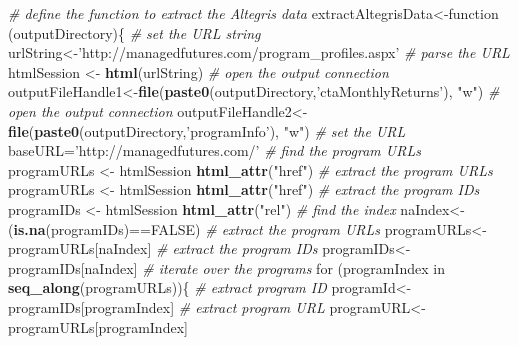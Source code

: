 \documentclass[]{article}
\newenvironment{Shaded}{\begin{snugshade}}{\end{snugshade}}
\newcommand{\KeywordTok}[1]{\textcolor[rgb]{0.13,0.29,0.53}{\textbf{{#1}}}}
\newcommand{\StringTok}[1]{\textcolor[rgb]{0.31,0.60,0.02}{{#1}}}
\newcommand{\CommentTok}[1]{\textcolor[rgb]{0.56,0.35,0.01}{\textit{{#1}}}}
\newcommand{\OtherTok}[1]{\textcolor[rgb]{0.56,0.35,0.01}{{#1}}}
\newcommand{\NormalTok}[1]{{#1}}
\begin{document}
\begin{Shaded}
\begin{Highlighting}[]
\CommentTok{# define the function to extract the Altegris data}
\NormalTok{extractAltegrisData<-function (outputDirectory)\{}
  \CommentTok{# set the URL string }
  \NormalTok{urlString<-}\StringTok{'http://managedfutures.com/program_profiles.aspx'}
  \CommentTok{# parse the URL}
  \NormalTok{htmlSession <-}\StringTok{ }\KeywordTok{html}\NormalTok{(urlString)}
  \CommentTok{# open the output connection}
  \NormalTok{outputFileHandle1<-}\KeywordTok{file}\NormalTok{(}\KeywordTok{paste0}\NormalTok{(outputDirectory,}\StringTok{'ctaMonthlyReturns'}\NormalTok{), }\StringTok{"w"}\NormalTok{)}
  \CommentTok{# open the output connection}
  \NormalTok{outputFileHandle2<-}\KeywordTok{file}\NormalTok{(}\KeywordTok{paste0}\NormalTok{(outputDirectory,}\StringTok{'programInfo'}\NormalTok{), }\StringTok{"w"}\NormalTok{)}
  \CommentTok{# set the URL}
  \NormalTok{baseURL=}\StringTok{'http://managedfutures.com/'}
  \CommentTok{# find the program URLs}
  \NormalTok{programURLs <-}\StringTok{ }\NormalTok{htmlSession %
\StringTok{    }\KeywordTok{html_attr}\NormalTok{(}\StringTok{"href"}\NormalTok{)}
  \CommentTok{# extract the program URLs}
  \NormalTok{programURLs <-}\StringTok{ }\NormalTok{htmlSession %
\StringTok{    }\KeywordTok{html_attr}\NormalTok{(}\StringTok{"href"}\NormalTok{)}
  \CommentTok{# extract the program IDs}
  \NormalTok{programIDs <-}\StringTok{ }\NormalTok{htmlSession %
\StringTok{    }\KeywordTok{html_attr}\NormalTok{(}\StringTok{"rel"}\NormalTok{)}
  \CommentTok{# find the index}
  \NormalTok{naIndex<-(}\KeywordTok{is.na}\NormalTok{(programIDs)==}\OtherTok{FALSE}\NormalTok{)}
  \CommentTok{# extract the program URLs}
  \NormalTok{programURLs<-programURLs[naIndex]}
  \CommentTok{# extract the program IDs}
  \NormalTok{programIDs<-programIDs[naIndex]}
  \CommentTok{# iterate over the programs}
  \NormalTok{for (programIndex in }\KeywordTok{seq_along}\NormalTok{(programURLs))\{}
    \CommentTok{# extract program ID}
    \NormalTok{programId<-programIDs[programIndex]}
    \CommentTok{# extract program URL}
    \NormalTok{programURL<-programURLs[programIndex]}
}}}
\end{Highlighting}
\end{Shaded}
\end{document}
